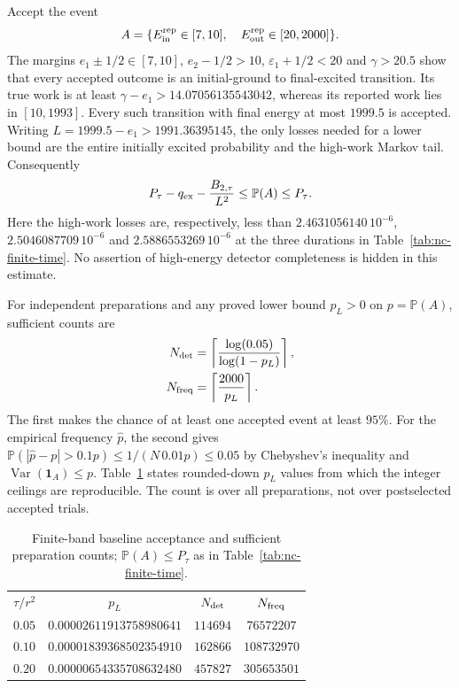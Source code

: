 \documentclass[aps,pra,reprint,superscriptaddress,longbibliography]{revtex4-2}
\newcommand{\Var}{\operatorname{Var}}
\newcommand{\Prob}{\mathbb P}
\begin{document}
Accept the event
\begin{equation}
 A=\{E_{\rm in}^{\rm rep}\in[7,10],\quad
                      E_{\rm out}^{\rm rep}\in[20,2000]\}.
 \label{eq:nc-bin}
\end{equation}
The margins $e_1\pm1/2\in[7,10]$, $e_2-1/2>10$,
$\varepsilon_1+1/2<20$ and $\gamma>20.5$ show that every
accepted outcome is an initial-ground to final-excited transition.
Its true work is at least
$\gamma-e_1>14.07056135543042$, whereas its reported work lies in
$[10,1993]$.  Every such transition with final energy at most $1999.5$
is accepted.  Writing $L=1999.5-e_1>1991.36395145$, the only losses
needed for a lower bound are the entire initially excited probability
and the high-work Markov tail.  Consequently
\begin{equation}
 P_\tau-q_{\rm ex}-\frac{B_{2,\tau}}{L^2}
            \le\Prob(A)\le P_\tau.
 \label{eq:nc-acceptance}
\end{equation}
Here the high-work losses are, respectively, less than
$2.4631056140\,10^{-6}$, $2.5046087709\,10^{-6}$ and
$2.5886553269\,10^{-6}$ at the three durations in
Table~\ref{tab:nc-finite-time}.  No assertion of high-energy detector
completeness is hidden in this estimate.

For independent preparations and any proved lower bound $p_L>0$ on
$p=\Prob(A)$, sufficient counts are
\begin{align}
 N_{\rm det}&=\left\lceil
          \frac{\log(0.05)}{\log(1-p_L)}\right\rceil,\nonumber\\
 N_{\rm freq}&=\left\lceil\frac{2000}{p_L}\right\rceil.
 \label{eq:nc-counts}
\end{align}
The first makes the chance of at least one accepted event at least
$95\%$.  For the empirical frequency $\widehat p$, the second gives
$\Prob(|\widehat p-p|>0.1p)\le1/(N\,0.01p)\le0.05$ by
Chebyshev's inequality and $\Var(\mathbf1_A)\le p$.
Table~\ref{tab:nc-detector-counts} states rounded-down $p_L$ values
from which the integer ceilings are reproducible.  The count is over
all preparations, not over postselected accepted trials.

\begin{table}[t]
\caption{Finite-band baseline acceptance and sufficient preparation
counts; $\Prob(A)\le P_\tau$ as in Table~\ref{tab:nc-finite-time}.}
\label{tab:nc-detector-counts}
\begin{ruledtabular}
\begin{tabular}{cccc}
$\tau/r^2$&$p_L$&$N_{\rm det}$&$N_{\rm freq}$\\
$0.05$&$0.00002611913758980641$&$114694$&$76572207$\\
$0.10$&$0.00001839368502354910$&$162866$&$108732970$\\
$0.20$&$0.00000654335708632480$&$457827$&$305653501$
\end{tabular}
\end{ruledtabular}
\end{table}
\end{document}
